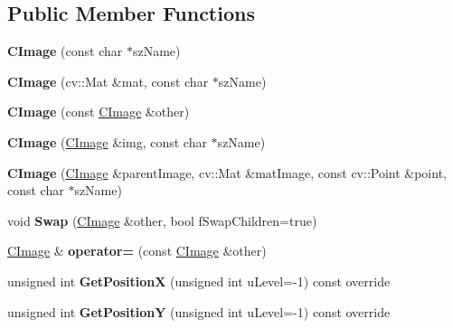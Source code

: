 \subsection*{Public Member Functions}
\begin{DoxyCompactItemize}
\item 
\mbox{\label{class_c_image_a21cd70160981d8e10e17be1731bcbadc}} 
{\bfseries C\+Image} (const char $\ast$sz\+Name)
\item 
\mbox{\label{class_c_image_a35bee31efed6acd1a6d35c9554d710ce}} 
{\bfseries C\+Image} (cv\+::\+Mat \&mat, const char $\ast$sz\+Name)
\item 
\mbox{\label{class_c_image_a8b4314c801dc837e80dd95c0783d2bed}} 
{\bfseries C\+Image} (const \hyperlink{class_c_image}{C\+Image} \&other)
\item 
\mbox{\label{class_c_image_ac606178f3d62ff9f18fb9d78fb21a0ae}} 
{\bfseries C\+Image} (\hyperlink{class_c_image}{C\+Image} \&img, const char $\ast$sz\+Name)
\item 
\mbox{\label{class_c_image_a9dbac297b3f353e847d1f681aa616b3f}} 
{\bfseries C\+Image} (\hyperlink{class_c_image}{C\+Image} \&parent\+Image, cv\+::\+Mat \&mat\+Image, const cv\+::\+Point \&point, const char $\ast$sz\+Name)
\item 
\mbox{\label{class_c_image_a5d51142006c5db5e16760523d82ff284}} 
void {\bfseries Swap} (\hyperlink{class_c_image}{C\+Image} \&other, bool f\+Swap\+Children=true)
\item 
\mbox{\label{class_c_image_a0ef878c3d788d3db9686e1f2e5bfaaaf}} 
\hyperlink{class_c_image}{C\+Image} \& {\bfseries operator=} (const \hyperlink{class_c_image}{C\+Image} \&other)
\item 
\mbox{\label{class_c_image_a22fe91a95249af8ead1325b515986f8a}} 
unsigned int {\bfseries Get\+PositionX} (unsigned int u\+Level=-\/1) const override
\item 
\mbox{\label{class_c_image_abfde3dc9e893134cd44d642de9d91d87}} 
unsigned int {\bfseries Get\+PositionY} (unsigned int u\+Level=-\/1) const override

\end{DoxyCompactItemize}
